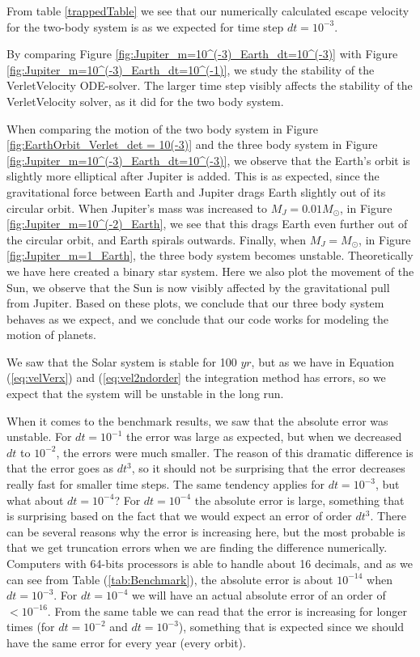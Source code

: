 \documentclass[norsk,a4paper,12pt]{article}
\begin{document}
{From table \ref{trappedTable} we see that our numerically calculated escape velocity for the two-body system is as we expected for time step $dt=10^{-3}$.

By comparing Figure \ref{fig:Jupiter_m=10^(-3)_Earth_dt=10^(-3)} with Figure \ref{fig:Jupiter_m=10^(-3)_Earth_dt=10^(-1)}, we study the stability of the VerletVelocity ODE-solver. The larger time step visibly affects the stability of the VerletVelocity solver, as it did for the two body system. 

\par

When comparing the motion of the two body system in Figure \ref{fig:EarthOrbit_Verlet_det = 10(-3)} and the three body system in Figure \ref{fig:Jupiter_m=10^(-3)_Earth_dt=10^(-3)}, we observe that the Earth's orbit is slightly more elliptical after Jupiter is added. This is as expected, since the gravitational force between Earth and Jupiter drags Earth slightly out of its circular orbit. When Jupiter's mass was increased to $M_J = 0.01 M_{\odot}$, in Figure \ref{fig:Jupiter_m=10^(-2)_Earth}, we see that this drags Earth even further out of the circular orbit, and Earth spirals outwards. Finally, when $M_J = M_{\odot}$, in Figure \ref{fig:Jupiter_m=1_Earth}, the three body system becomes unstable. Theoretically we have here created a binary star system. Here we also  plot the movement of the Sun, we observe that the Sun is now visibly affected by the gravitational pull from Jupiter. Based on these plots, we conclude that our three body system behaves as we expect, and we conclude that our code works for modeling the motion of planets.\par 
\vspace{3mm}
\par

We saw that the Solar system is stable for 100 $yr$, but as we have in Equation (\ref{eq:velVerx}) and (\ref{eq:vel2ndorder} the integration method has errors, so we expect that the system will be unstable in the long run. \par

When it comes to the benchmark results, we saw that the absolute error was unstable. For $dt=10^{-1}$ the error was large as expected, but when we decreased $dt$ to $10^{-2}$, the errors were much smaller. The reason of this dramatic difference is that the error goes as $dt^3$, so it should not be surprising that the error decreases really fast for smaller time steps. The same tendency applies for $dt=10^{-3}$, but what about $dt=10^{-4}$? For $dt=10^{-4}$ the absolute error is large, something that is surprising based on the fact that we would expect an error of order $dt^3$. There can be several reasons why the error is increasing here, but the most probable is that we get truncation errors when we are finding the difference numerically. Computers with 64-bits processors is able to handle about 16 decimals, and as we can see from Table (\ref{tab:Benchmark}), the absolute error is about $10^{-14}$ when $dt=10^{-3}$. For $dt=10^{-4}$ we will have an actual absolute error of an order of $ <10^{-16}$. From the same table we can read that the error is increasing for longer times (for $dt=10^{-2}$ and $dt=10^{-3}$), something that is expected since we should have the same error for every year (every orbit). 
}
\end{document}
